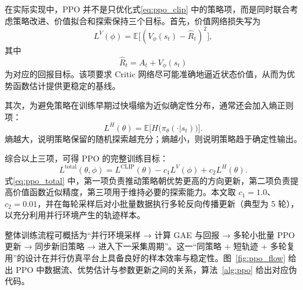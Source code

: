 \documentclass[12pt,a4paper]{ctexart}
\numberwithin{equation}{section}
\numberwithin{table}{section}
\numberwithin{figure}{section}
\newcommand{\subtopic}[1]{\par\addvspace{0.2\baselineskip}\ignorespaces}
\begin{document}
\subtopic{PPO 完整目标函数}
在实际实现中，PPO 并不是只优化式\eqref{eq:ppo_clip} 中的策略项，而是同时联合考虑策略改进、价值拟合和探索保持三个目标。首先，价值网络损失写为
\begin{equation}
L^{V}(\phi)=\mathbb{E}\bigl[(V_\phi(s_t)-\hat{R}_t)^2\bigr],
\label{eq:ppo_value_loss}
\end{equation}
其中
\begin{equation}
\hat{R}_t=\hat{A}_t+V_\phi(s_t)
\label{eq:ppo_return_target}
\end{equation}
为对应的回报目标。该项要求 Critic 网络尽可能准确地逼近状态价值，从而为优势函数估计提供更稳定的基线。

其次，为避免策略在训练早期过快塌缩为近似确定性分布，通常还会加入熵正则项：
\begin{equation}
L^{H}(\theta)=\mathbb{E}\bigl[H\bigl(\pi_\theta(\cdot|s_t)\bigr)\bigr].
\label{eq:ppo_entropy}
\end{equation}
熵越大，说明策略保留的随机探索越充分；熵越小，则说明策略趋于确定性输出。

综合以上三项，可得 PPO 的完整训练目标：
\begin{equation}
L^{\text{total}}(\theta,\phi)=L^{\mathrm{CLIP}}(\theta)-c_1L^{V}(\phi)+c_2L^{H}(\theta).
\label{eq:ppo_total}
\end{equation}
式\eqref{eq:ppo_total} 中，第一项负责推动策略朝优势更高的方向更新，第二项负责提高价值函数近似精度，第三项用于维持必要的探索能力。本文取 $c_1=1.0$、$c_2=0.01$，并在每轮采样后对小批量数据执行多轮反向传播更新（典型为 5 轮），以充分利用并行环境产生的轨迹样本。

整体训练流程可概括为“并行环境采样 → 计算 GAE 与回报 → 多轮小批量 PPO 更新 → 同步新旧策略 → 进入下一采集周期”。这一“同策略 + 短轨迹 + 多轮复用”的设计在并行仿真平台上具备良好的样本效率与稳定性。图~\ref{fig:ppo_flow} 给出 PPO 中数据流、优势估计与参数更新之间的关系，算法~\ref{alg:ppo} 给出对应伪代码。
\end{document}

